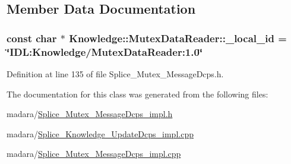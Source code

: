 \subsection{Member Data Documentation}
\hypertarget{classKnowledge_1_1MutexDataReader_a56c9eccd6ba3fbadffbd33762682479a}{
\subsubsection[{\_\-local\_\-id}]{\setlength{\rightskip}{0pt plus 5cm}const char $\ast$ {\bf Knowledge::MutexDataReader::\_\-local\_\-id} = \char`\"{}IDL:Knowledge/MutexDataReader:1.0\char`\"{}}}
\label{dc/d57/classKnowledge_1_1MutexDataReader_a56c9eccd6ba3fbadffbd33762682479a}


Definition at line 135 of file Splice\_\-Mutex\_\-MessageDcps.h.



The documentation for this class was generated from the following files:\begin{DoxyCompactItemize}
\item 
madara/\hyperlink{Splice__Mutex__MessageDcps__impl_8h}{Splice\_\-Mutex\_\-MessageDcps\_\-impl.h}\item 
madara/\hyperlink{Splice__Knowledge__UpdateDcps__impl_8cpp}{Splice\_\-Knowledge\_\-UpdateDcps\_\-impl.cpp}\item 
madara/\hyperlink{Splice__Mutex__MessageDcps__impl_8cpp}{Splice\_\-Mutex\_\-MessageDcps\_\-impl.cpp}\end{DoxyCompactItemize}
